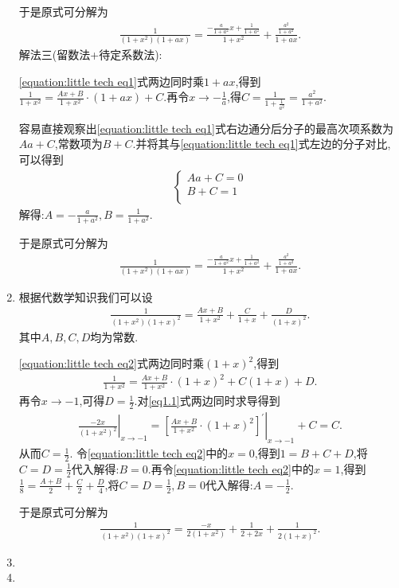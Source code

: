 \documentclass[../../main.tex]{subfiles}
\begin{document}
\begin{solution}
\begin{enumerate}
于是原式可分解为
\begin{align*}
\frac{1}{\left( 1+x^2 \right) \left( 1+ax \right)}=\frac{-\frac{a}{1+a^2}x+\frac{1}{1+a^2}}{1+x^2}+\frac{\frac{a^2}{1+a^2}}{1+ax}.
\end{align*}
{\color{blue}解法三(留数法+待定系数法):}

\eqref{equation:little tech eq1}式两边同时乘$1+ax$,得到$\frac{1}{1+x^2}=\frac{Ax+B}{1+x^2}\cdot \left( 1+ax \right) +C$.再令$x\to-\frac{1}{a}$,得$C=\frac{1}{1+\frac{1}{a^2}}=\frac{a^2}{1+a^2}$.

容易直接观察出\eqref{equation:little tech eq1}式右边通分后分子的最高次项系数为$Aa+C$,常数项为$B+C$.并将其与\eqref{equation:little tech eq1}式左边的分子对比,可以得到
\begin{align*}
\begin{cases}
Aa+C=0\\
B+C=1\\
\end{cases}
\end{align*}
解得:$A=-\frac{a}{1+a^2},B=\frac{1}{1+a^2}$.

于是原式可分解为
\begin{align*}
\frac{1}{\left( 1+x^2 \right) \left( 1+ax \right)}=\frac{-\frac{a}{1+a^2}x+\frac{1}{1+a^2}}{1+x^2}+\frac{\frac{a^2}{1+a^2}}{1+ax}.
\end{align*}

\item 根据代数学知识我们可以设
\begin{align}\label{equation:little tech eq2}
\frac{1}{\left( 1+x^2 \right) \left( 1+x \right) ^2}=\frac{Ax+B}{1+x^2}+\frac{C}{1+x}+\frac{D}{\left( 1+x \right) ^2}.  
\end{align}
其中$A,B,C,D$均为常数.

\eqref{equation:little tech eq2}式两边同时乘$(1+x)^2$,得到
\begin{align}\label{eq1.1}
\frac{1}{1+x^2}=\frac{Ax+B}{1+x^2}\cdot \left( 1+x \right) ^2+C\left( 1+x \right)+D.
\end{align}
再令$x\to-1$,可得$D=\frac{1}{2}$.对\eqref{eq1.1}式两边同时求导得到
\begin{align*}
\left.\frac{-2x}{\left( 1+x^2 \right) ^2}\right|_{x\rightarrow -1}^{}=\left.\left[ \frac{Ax+B}{1+x^2}\cdot \left( 1+x \right) ^2 \right] ^{\prime}\right|_{x\rightarrow -1}+C=C.
\end{align*}
从而$C=\frac{1}{2}$.
令\eqref{equation:little tech eq2}中的$x=0$,得到$1=B+C+D$,将$C=D=\frac{1}{2}$代入解得:$B=0$.再令\eqref{equation:little tech eq2}中的$x=1$,得到$\frac{1}{8}=\frac{A+B}{2}+\frac{C}{2}+\frac{D}{4}$,将$C=D=\frac{1}{2},B=0$代入解得:$A=-\frac{1}{2}$.

于是原式可分解为
\begin{align*}
\frac{1}{\left( 1+x^2 \right) \left( 1+x \right) ^2}=\frac{-x}{2\left( 1+x^2 \right)}+\frac{1}{2+2x}+\frac{1}{2\left( 1+x \right) ^2}.
\end{align*}

\item 

\item 
\end{enumerate}
\end{solution}
\end{document}
